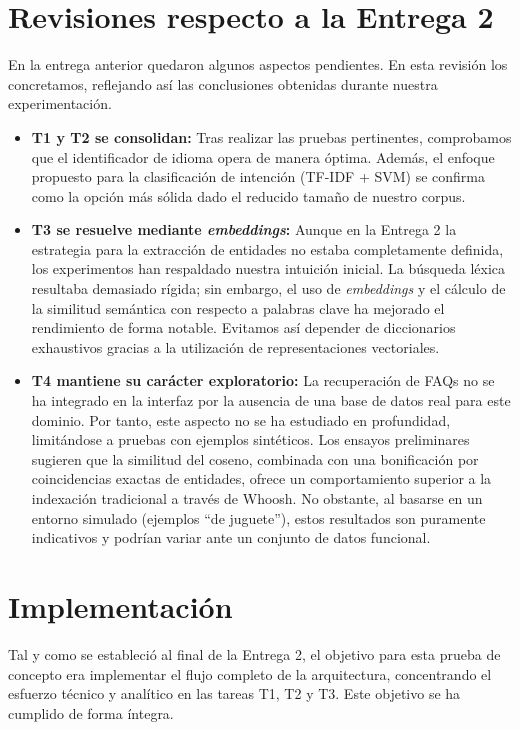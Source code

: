 \documentclass[11pt,a4paper,twoside]{article}
\theoremstyle{definition}
\numberwithin{equation}{section}
\begin{document}
\section{Revisiones respecto a la Entrega 2}
En la entrega anterior quedaron algunos aspectos pendientes. En esta revisión los concretamos, reflejando así las conclusiones obtenidas durante nuestra experimentación.
\begin{itemize}
	\item \textbf{T1 y T2 se consolidan:} Tras realizar las pruebas pertinentes, comprobamos que el identificador de idioma opera de manera óptima. Además, el enfoque propuesto para la clasificación de intención (TF-IDF + SVM) se confirma como la opción más sólida dado el reducido tamaño de nuestro corpus.
	
	\item \textbf{T3 se resuelve mediante \textit{embeddings}:} Aunque en la Entrega 2 la estrategia para la extracción de entidades no estaba completamente definida, los experimentos han respaldado nuestra intuición inicial. La búsqueda léxica resultaba demasiado rígida; sin embargo, el uso de \textit{embeddings} y el cálculo de la similitud semántica con respecto a palabras clave ha mejorado el rendimiento de forma notable. Evitamos así depender de diccionarios exhaustivos gracias a la utilización de representaciones vectoriales.
	
	\item \textbf{T4 mantiene su carácter exploratorio:} La recuperación de FAQs no se ha integrado en la interfaz por la ausencia de una base de datos real para este dominio. Por tanto, este aspecto no se ha estudiado en profundidad, limitándose a pruebas con ejemplos sintéticos. Los ensayos preliminares sugieren que la similitud del coseno, combinada con una bonificación por coincidencias exactas de entidades, ofrece un comportamiento superior a la indexación tradicional a través de Whoosh. No obstante, al basarse en un entorno simulado (ejemplos ``de juguete''), estos resultados son puramente indicativos y podrían variar ante un conjunto de datos funcional.
\end{itemize}


\section{Implementación}
Tal y como se estableció al final de la Entrega 2, el objetivo para esta prueba de concepto era implementar el flujo completo de la arquitectura, concentrando el esfuerzo técnico y analítico en las tareas T1, T2 y T3. Este objetivo se ha cumplido de forma íntegra.
\end{document}
